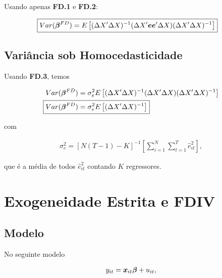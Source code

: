 \documentclass[11pt,oneside,a4paper]{article}
\numberwithin{equation}{section}
\begin{document}
\begin{description}
\begin{description}
Usando apenas \textbf{FD.1} e \textbf{FD.2}:

\vspace{-1 em}
\begin{align*} 
\Aboxed{
Var( \mbs{\beta}^{FD} ) = 
E \left[
( \Delta X' \Delta X )^{-1}
( \Delta X' \mbs{e}  \mbs{e}' \Delta X )
( \Delta X' \Delta X )^{-1} 
\right]}
\end{align*}

\subsection*{Variância sob Homocedasticidade}

Usando \textbf{FD.3}, temos

\vspace{-1 em}
\begin{align*} 
Var( \mbs{\beta}^{FD} ) &= 
\sigma_{e}^{2}
E \left[
( \Delta X' \Delta X )^{-1}
( \Delta X' \Delta X )
( \Delta X' \Delta X )^{-1} 
\right]
\\
\Aboxed{
Var( \mbs{\beta}^{FD} ) &= 
\sigma^2_{e}
E \left[
( \Delta X' \Delta X )^{-1} 
\right]}
\end{align*}

\noindent 
com

\vspace{-1 em}
\begin{align*} 
\sigma^2_{e} = 
\left[ N ( T - 1 ) - K \right]^{-1}
\left[  
\sum_{i=1}^{N} 
\sum_{t=1}^{T}
\hat{e}_{it}^{2}
\right],
\end{align*}

\noindent
que é a média de todos $\hat{e}^{2}_{it}$ contando $K$ regressores.

\clearpage
\section{Exogeneidade Estrita e FDIV}


\subsection*{Modelo}

No seguinte modelo

\vspace{-1 em}
\begin{align*} 
	y_{it} = \boldsymbol{x}_{it} \boldsymbol{\beta} + u_{it},
\end{align*}


\end{description}
\end{description}
\end{document}
